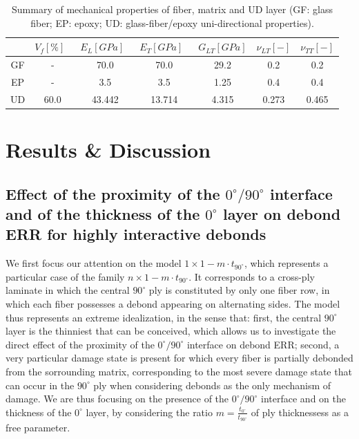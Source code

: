 \documentclass[Review,sagev,times]{sagej}
\begin{document}
\begin{table}[!h]
 \centering
 \caption{Summary of mechanical properties of fiber, matrix and UD layer (GF: glass fiber; EP: epoxy; UD: glass-fiber/epoxy uni-directional properties).}%
 \begin{tabular}{ccccccc}
\small& \small\textbf{$V_{f}\left[\%\right]$}\  &\small \textbf{$E_{L}\left[GPa\right]$}\ & \small\textbf{$E_{T}\left[GPa\right]$}\  & \small\textbf{$G_{LT}\left[GPa\right]$} &\small\textbf{$\nu_{LT}\left[-\right]$} &\small \textbf{$\nu_{TT}\left[-\right]$} \\
\midrule
\small GF &\small-   &\small 70.0 &\small 70.0  &\small 29.2 &\small 0.2  &\small 0.2\\
\small EP    &-&\small 3.5 &\small 3.5   &\small 1.25 &\small  0.4&\small 0.4\\
\small UD&\small60.0&\small43.442&\small13.714&\small 4.315&\small 0.273&\small0.465\\
\end{tabular}
\label{tab:phaseprop}
\end{table}


\section{Results \& Discussion}

\subsection{Effect of the proximity of the $0^{\circ}/90^{\circ}$ interface and of the thickness of the $0^{\circ}$ layer on debond ERR for highly interactive debonds}\label{subsec:thickness}

We first focus our attention on the model $1\times 1-m\cdot t_{90^{\circ}}$, which represents a particular case of the family $n\times 1-m\cdot t_{90^{\circ}}$. It corresponds to a cross-ply laminate in which the central $90^{\circ}$ ply is constituted by only one fiber row, in which each fiber possesses a debond appearing on alternating sides. The model thus represents an extreme idealization, in the sense that: first, the central $90^{\circ}$ layer is the thinniest that can be conceived, which allows us to investigate the direct effect of the proximity of the $0^{\circ}/90^{\circ}$ interface on debond ERR; second, a very particular damage state is present for which every fiber is partially debonded from the sorrounding matrix, corresponding to the most severe damage state that can occur in the $90^{\circ}$ ply when considering debonds as the only mechanism of damage. We are thus focusing on the presence of the $0^{\circ}/90^{\circ}$ interface and on the thickness of the $0^{\circ}$ layer, by considering the ratio $m=\frac{t_{0^{\circ}}}{t_{90^{\circ}}}$ of ply thicknessess as a free parameter.\\
\end{document}
